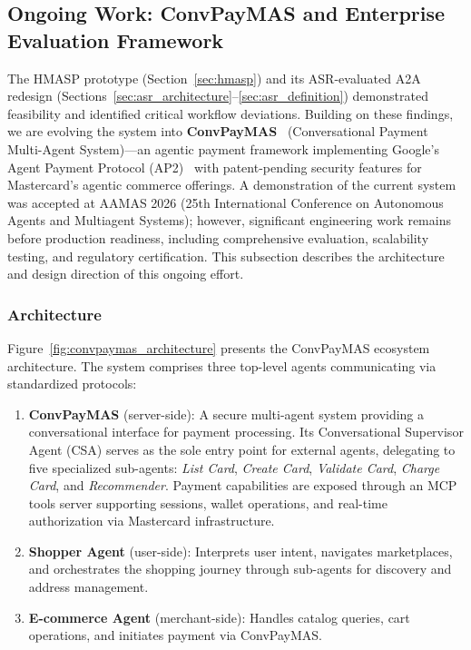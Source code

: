 \subsection{Ongoing Work: ConvPayMAS and Enterprise Evaluation Framework}
\label{sec:convpaymas}

The HMASP prototype (Section~\ref{sec:hmasp}) and its ASR-evaluated A2A redesign (Sections~\ref{sec:asr_architecture}--\ref{sec:asr_definition}) demonstrated feasibility and identified critical workflow deviations. Building on these findings, we are evolving the system into \textbf{ConvPayMAS}~\cite{chua2026convpaymas} (Conversational Payment Multi-Agent System)---an agentic payment framework implementing Google's Agent Payment Protocol (AP2)~\cite{google2025ap2} with patent-pending security features for Mastercard's agentic commerce offerings. A demonstration of the current system was accepted at AAMAS 2026 (25th International Conference on Autonomous Agents and Multiagent Systems); however, significant engineering work remains before production readiness, including comprehensive evaluation, scalability testing, and regulatory certification. This subsection describes the architecture and design direction of this ongoing effort.

\subsubsection{Architecture}

Figure~\ref{fig:convpaymas_architecture} presents the ConvPayMAS ecosystem architecture. The system comprises three top-level agents communicating via standardized protocols:

\begin{enumerate}[leftmargin=*]
    \item \textbf{ConvPayMAS} (server-side): A secure multi-agent system providing a conversational interface for payment processing. Its Conversational Supervisor Agent (CSA) serves as the sole entry point for external agents, delegating to five specialized sub-agents: \textit{List Card}, \textit{Create Card}, \textit{Validate Card}, \textit{Charge Card}, and \textit{Recommender}. Payment capabilities are exposed through an MCP tools server supporting sessions, wallet operations, and real-time authorization via Mastercard infrastructure.
    \item \textbf{Shopper Agent} (user-side): Interprets user intent, navigates marketplaces, and orchestrates the shopping journey through sub-agents for discovery and address management.
    \item \textbf{E-commerce Agent} (merchant-side): Handles catalog queries, cart operations, and initiates payment via ConvPayMAS.
\end{enumerate}

